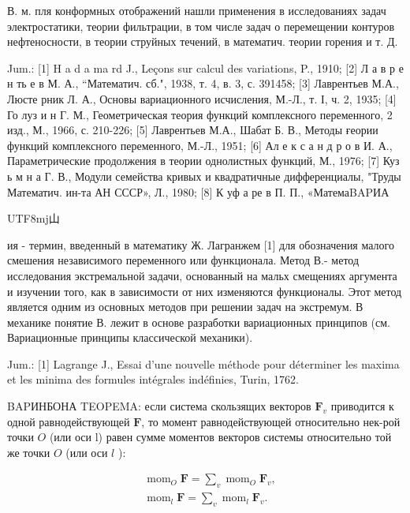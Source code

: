 \documentclass[10pt]{article}
\begin{document}
В. м. пля конформных отображений нашли применения в исследованиях задач электростатики, теории фильтрации, в том числе задач о перемещении контуров нефтеносности, в теории струйных течений, в математич. теории горения и т. Д.



Jum.: [1] H a d a ma rd J., Leçons sur calcul des variations, P., 1910; [2] Л а в р е н ть е в М. А., “Математич. сб.", 1938, т. 4, в. 3, с. 391458; [3] Лаврентьев М.А., Люсте рник Л. А., Основы вариационного исчисления, М.-Л., т. І, ч. 2, 1935; [4] Го луз и н Г. М., Геометрическая теория функций комплексного переменного, 2 изд., М., 1966, с. 210-226; [5] Лаврентьев М.А., Шабат Б. В., Методы ғеории функций комплексного переменного, М.-Л., 1951; [6] Ал е к с а н д р о в И. А., Параметрические продолжения в теории однолистных функций, М., 1976; [7] Куз ь м н а Г. В., Модули семейства кривых и квадратичные дифференциалы, "Труды Математич. ин-та АН СССР», Л., 1980; [8] К уф а ре в П. П., «МатемаBAPИА\begin{CJK}{UTF8}{mj}山\end{CJK}ия - термин, введенный в математику Ж. Лагранжем [1] для обозначения малого смешения независимого переменного или функционала. Метод В.- метод исследования экстремальной задачи, основанный на мальх смещениях аргумента и изучении того, как в зависимости от них изменяются функционалы. Этот метод является одним из основных методов при решении задач на экстремум. В механике понятие В. лежит в основе разработки вариационных принципов (см. Вариационные принципы классической механики).



Jum.: [1] Lagrange J., Essai d'une nouvelle méthode pour déterminer les maxima et les minima des formules intégrales indéfinies, Turin, 1762.



BAPИНБОНА TEOPEMA: если система скользящих векторов $\boldsymbol{F}_{v}$ приводится к одной равнодействующей $\boldsymbol{F}$, то момент равнодействующей относительно нек-рой точки $O$ (или оси l) равен сумме моментов векторов системы относительно той же точки $O$ (или оси $l$ ):



\[

\begin{aligned}

& \operatorname{mom}_{O} \boldsymbol{F}=\sum_{v} \operatorname{mom}_{O} \boldsymbol{F}_{v}, \\

& \operatorname{mom}_{l} \boldsymbol{F}=\sum_{v} \operatorname{mom}_{l} \boldsymbol{F}_{v} .

\end{aligned}

\]
\end{document}
